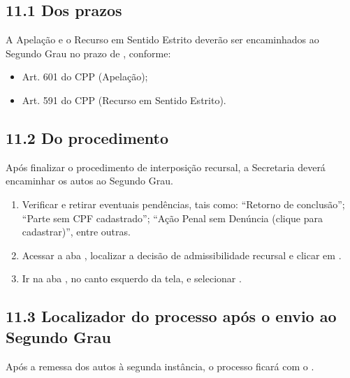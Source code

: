 \documentclass[letterpaper,10pt,brazil]{sphinxmanual}
\begin{document}
\subsection{11.1 \textendash{} Dos prazos}
\label{\detokenize{12encaminhar_segundo_grau:dos-prazos}}
\sphinxAtStartPar
A Apelação e o Recurso em Sentido Estrito deverão ser encaminhados ao Segundo Grau no prazo de , conforme:
\begin{itemize}
\item {} 
\sphinxAtStartPar
Art. 601 do CPP (Apelação);

\item {} 
\sphinxAtStartPar
Art. 591 do CPP (Recurso em Sentido Estrito).

\end{itemize}


\subsection{11.2 \textendash{} Do procedimento}
\label{\detokenize{12encaminhar_segundo_grau:do-procedimento}}
\sphinxAtStartPar
Após finalizar o procedimento de interposição recursal, a Secretaria deverá encaminhar os autos ao Segundo Grau.

\sphinxAtStartPar
{}
\begin{enumerate}
%
\item {} 
\sphinxAtStartPar
Verificar e retirar eventuais pendências, tais como:
\sphinxhyphen{} “Retorno de conclusão”;
\sphinxhyphen{} “Parte sem CPF cadastrado”;
\sphinxhyphen{} “Ação Penal sem Denúncia (clique para cadastrar)”, entre outras.

\item {} 
\sphinxAtStartPar
Acessar a aba , localizar a decisão de admissibilidade recursal e clicar em .

\item {} 
\sphinxAtStartPar
Ir na aba , no canto esquerdo da tela, e selecionar .

\end{enumerate}


\subsection{11.3 \textendash{} Localizador do processo após o envio ao Segundo Grau}
\label{\detokenize{12encaminhar_segundo_grau:localizador-do-processo-apos-o-envio-ao-segundo-grau}}
\sphinxAtStartPar
Após a remessa dos autos à segunda instância, o processo ficará com o .
\end{document}
